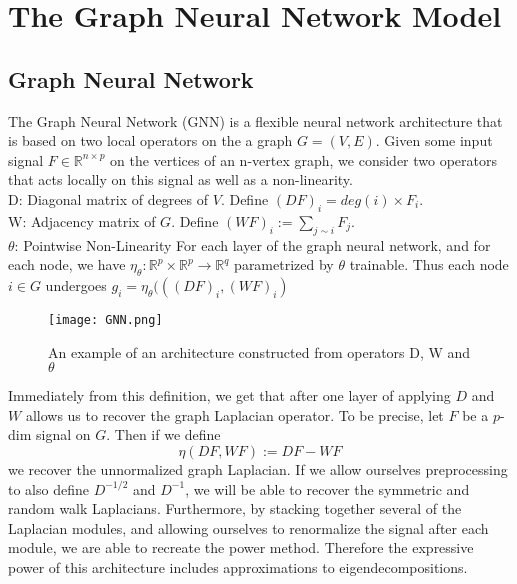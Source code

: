 \chapter{The Graph Neural Network Model}


\section{Graph Neural Network}

The Graph Neural Network (GNN) is a flexible neural network architecture that is based on two local operators on the a graph $G = (V, E)$. Given some input signal $F \in \mathbb{R}^{n \times p}$ on the vertices of an n-vertex graph, we consider two operators that acts locally on this signal as well as a non-linearity.\\


\noindent D: Diagonal matrix of degrees of $V$.  Define $(DF)_i = deg(i) \times F_i$.  \\
W: Adjacency matrix of $G$.  Define $(WF)_i:= \sum_{j\sim i }F_j.$\\
\textbf{$\theta$}: Pointwise Non-Linearity For each layer of the graph neural network, and for each node, we have $\eta_{\theta}: \mathbb{R}^p \times \mathbb{R}^p \rightarrow \mathbb{R}^q$ parametrized by $\theta$ trainable. Thus each node $i \in G$ undergoes $g_i = \eta_{\theta}(((DF)_i, (WF)_i)$\\


\begin{figure}
\begin{center}
  \texttt{[image: GNN.png]}
  \caption{An example of an architecture constructed from operators D, W and $\theta$}
  \label{fig:GNN}
 \end{center}
\end{figure}

Immediately from this definition, we get that after one layer of applying $D$ and $W$ allows us to recover the graph Laplacian operator.  To be precise, let $F$ be a $p$-dim signal on $G$.  Then if we define $$ \eta(DF, WF) := DF - WF$$ we recover the unnormalized graph Laplacian.  If we allow ourselves preprocessing to also define $D^{-1/2}$ and $D^{-1}$, we will be able to recover the symmetric and random walk Laplacians.  Furthermore, by stacking together several of the Laplacian modules, and allowing ourselves to renormalize the signal after each  module, we are able to recreate the power method.  Therefore the expressive power of this architecture includes approximations to eigendecompositions.\\

